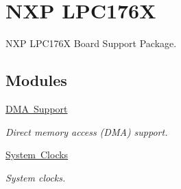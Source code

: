 \hypertarget{group__RTEMSBSPsARMLPC176X}{}\section{N\+XP L\+P\+C176X}
\label{group__RTEMSBSPsARMLPC176X}


N\+XP L\+P\+C176X Board Support Package.  


\subsection*{Modules}
\begin{DoxyCompactItemize}
\item 
\mbox{\hyperlink{group__lpc176x__dma}{D\+M\+A Support}}
\begin{DoxyCompactList}\small\item\em Direct memory access (D\+MA) support. \end{DoxyCompactList}\item 
\mbox{\hyperlink{group__lpc176x__clock}{System Clocks}}
\begin{DoxyCompactList}\small\item\em System clocks. \end{DoxyCompactList}\end{DoxyCompactItemize}
